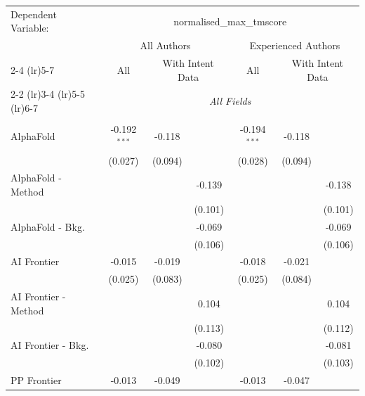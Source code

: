 \begingroup
\centering
\begin{tabular}{lcccccc}
   \tabularnewline \midrule \midrule
   Dependent Variable: & \multicolumn{6}{c}{normalised\_max\_tmscore}\\
 & \multicolumn{3}{c}{All Authors} & \multicolumn{3}{c}{Experienced Authors} \\
\cmidrule(lr){2-4} \cmidrule(lr){5-7}
 & \multicolumn{1}{c}{All} & \multicolumn{2}{c}{With Intent Data} & \multicolumn{1}{c}{All} & \multicolumn{2}{c}{With Intent Data} \\
\cmidrule(lr){2-2} \cmidrule(lr){3-4} \cmidrule(lr){5-5} \cmidrule(lr){6-7}
 & \multicolumn{6}{c}{\textit{All Fields}} \\ \\
   AlphaFold            & -0.192$^{***}$ & -0.118  &              & -0.194$^{***}$ & -0.118  &   \\   
                        & (0.027)        & (0.094) &              & (0.028)        & (0.094) &   \\   
   AlphaFold - Method   &                &         & -0.139       &                &         & -0.138\\   
                        &                &         & (0.101)      &                &         & (0.101)\\   
   AlphaFold - Bkg.     &                &         & -0.069       &                &         & -0.069\\   
                        &                &         & (0.106)      &                &         & (0.106)\\   
   AI Frontier          & -0.015         & -0.019  &              & -0.018         & -0.021  &   \\   
                        & (0.025)        & (0.083) &              & (0.025)        & (0.084) &   \\   
   AI Frontier - Method &                &         & 0.104        &                &         & 0.104\\   
                        &                &         & (0.113)      &                &         & (0.112)\\   
   AI Frontier - Bkg.   &                &         & -0.080       &                &         & -0.081\\   
                        &                &         & (0.102)      &                &         & (0.103)\\   
   PP Frontier          & -0.013         & -0.049  &              & -0.013         & -0.047  &   \\   

\end{tabular}

